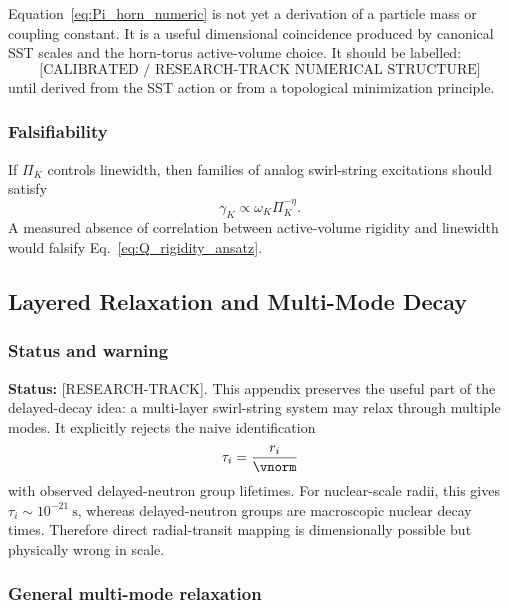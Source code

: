         Equation~\eqref{eq:Pi_horn_numeric} is not yet a derivation of a particle mass or coupling constant. It is a useful dimensional coincidence produced by canonical SST scales and the horn-torus active-volume choice. It should be labelled:
        \[
            \boxed{
                \text{[CALIBRATED / RESEARCH-TRACK NUMERICAL STRUCTURE]}
            }
        \]
        until derived from the SST action or from a topological minimization principle.
    
    \subsubsection*{Falsifiability}
        
        If \(\Pi_K\) controls linewidth, then families of analog swirl-string excitations should satisfy
        \[
            \gamma_K \propto \omega_K \Pi_K^{-\eta}.
        \]
        A measured absence of correlation between active-volume rigidity and linewidth would falsify Eq.~\eqref{eq:Q_rigidity_ansatz}.

\subsection{Layered Relaxation and Multi-Mode Decay}
    \label{app:layered-relaxation}
    
    \subsubsection*{Status and warning}
        
        \noindent
        \textbf{Status:} [RESEARCH-TRACK].
        This appendix preserves the useful part of the delayed-decay idea: a multi-layer swirl-string system may relax through multiple modes. It explicitly rejects the naive identification
        \[
            \tau_i = \frac{r_i}{\vnorm}
        \]
        with observed delayed-neutron group lifetimes. For nuclear-scale radii, this gives \(\tau_i\sim 10^{-21}\ \mathrm{s}\), whereas delayed-neutron groups are macroscopic nuclear decay times. Therefore direct radial-transit mapping is dimensionally possible but physically wrong in scale.
    
    \subsubsection*{General multi-mode relaxation}
        
